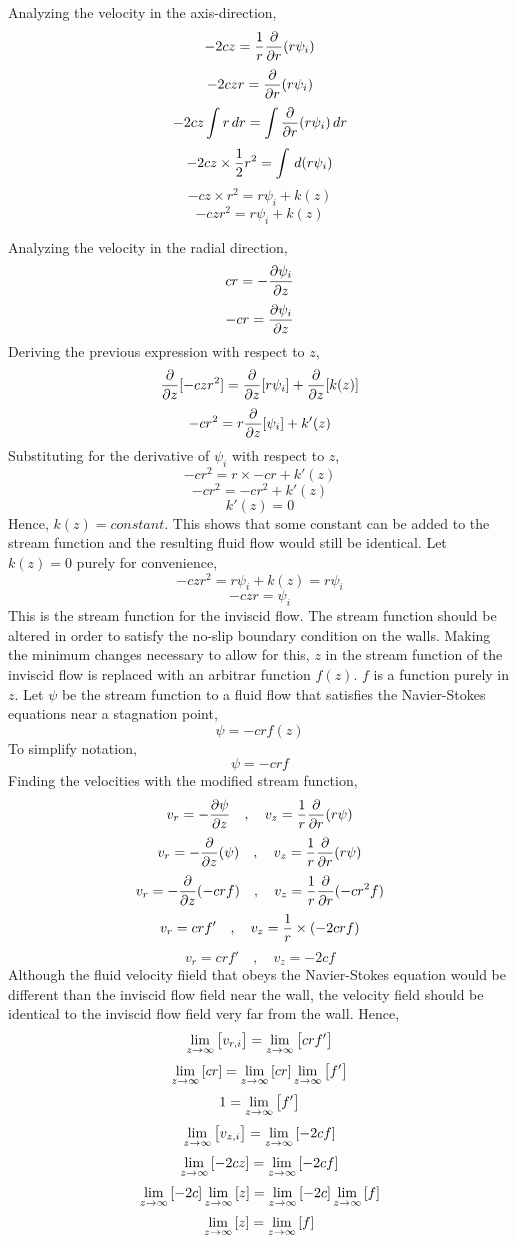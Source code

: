 \documentclass[a4paper, 12pt]{report}
\begin{document}
\begin{center}
Analyzing the velocity in the axis-direction,
$$-2cz = \frac{1}{r}\frac{\partial}{\partial r}(r\psi_i)$$
$$-2czr = \frac{\partial}{\partial r}(r\psi_i)$$
$$-2cz\int r\,dr = \int \frac{\partial}{\partial r}(r\psi_i)\,dr$$
$$-2cz\times \frac{1}{2}r^2 = \int \,d(r\psi_i)$$
$$-cz\times r^2 = r\psi_i + k(z)$$
$$-czr^2 = r\psi_i + k(z)$$

Analyzing the velocity in the radial direction,
$$cr =  -\frac{\partial \psi_i}{\partial z}$$
$$-cr =  \frac{\partial \psi_i}{\partial z}$$
Deriving the previous expression with respect to $z$,
$$\frac{\partial}{\partial z}[-czr^2] = \frac{\partial}{\partial z}[r\psi_i] + \frac{\partial}{\partial z}[k(z)]$$
$$-cr^2 = r\frac{\partial}{\partial z}[\psi_i] + k'(z)$$
Substituting for the derivative of $\psi_i$ with respect to $z$,
$$-cr^2 = r\times -cr + k'(z)$$
$$-cr^2 = -cr^2 + k'(z)$$
$$k'(z)=0$$
Hence, $k(z) = constant$. This shows that some constant can be added to the stream function and the resulting fluid flow would still be identical. Let $k(z)=0$ purely for convenience,
$$-czr^2 = r\psi_i + k(z) = r\psi_i$$
$$-czr = \psi_i$$
This is the stream function for the inviscid flow. The stream function should be altered in order to satisfy the no-slip boundary condition on the walls. Making the minimum changes necessary to allow for this, $z$ in the stream function of the inviscid flow is replaced with an arbitrar function $f(z)$. $f$ is a function purely in $z$. Let $\psi$ be the stream function to a fluid flow that satisfies the Navier-Stokes equations near a stagnation point,
$$\psi = -crf(z)$$
To simplify notation,
$$\psi = -crf$$
Finding the velocities with the modified stream function,
$$v_r =  -\frac{\partial \psi}{\partial z} \quad,\quad v_z = \frac{1}{r}\frac{\partial}{\partial r}(r\psi)$$
$$v_r =  -\frac{\partial}{\partial z}(\psi) \quad,\quad v_z = \frac{1}{r}\frac{\partial}{\partial r}(r\psi)$$
$$v_r =  -\frac{\partial}{\partial z}(-crf) \quad,\quad v_z = \frac{1}{r}\frac{\partial}{\partial r}(-cr^2f)$$
$$v_r =  crf' \quad,\quad v_z = \frac{1}{r}\times (-2crf)$$
$$v_r =  crf' \quad,\quad v_z = -2cf$$
Although the fluid velocity fiield that obeys the Navier-Stokes equation would be different than the inviscid flow field near the wall, the velocity field should be identical to the inviscid flow field very far from the wall. Hence, 
$$\lim_{z\to\infty}\left[v_{r,i}\right] =  \lim_{z\to\infty}\left[crf'\right]$$
$$\lim_{z\to\infty}\left[cr\right] =  \lim_{z\to\infty}\left[cr\right]\lim_{z\to\infty}\left[f'\right]$$
$$1 = \lim_{z\to\infty}\left[f'\right]$$
$$\lim_{z\to\infty}\left[v_{z,i}\right] = \lim_{z\to\infty}\left[-2cf\right]$$
$$\lim_{z\to\infty}\left[-2cz\right] = \lim_{z\to\infty}\left[-2cf\right]$$
$$\lim_{z\to\infty}\left[-2c\right]\lim_{z\to\infty}\left[z\right] = \lim_{z\to\infty}\left[-2c\right]\lim_{z\to\infty}\left[f\right]$$
$$\lim_{z\to\infty}\left[z\right] = \lim_{z\to\infty}\left[f\right]$$




\end{center}
\end{document}
